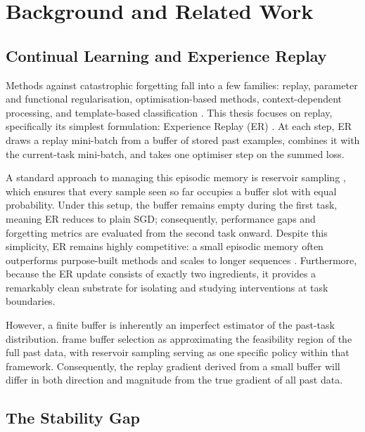 \section{Background and Related Work}
\label{sec:literature}

\subsection{Continual Learning and Experience Replay}
\label{subsec:experience_replay}

Methods against catastrophic forgetting fall into a few families: replay, parameter and functional regularisation, optimisation-based methods, context-dependent processing, and template-based classification \cite{van_de_Ven_2025}. This thesis focuses on replay, specifically its simplest formulation: Experience Replay (ER) \cite{chaudhry2019tinyepisodicmemories}. At each step, ER draws a replay mini-batch from a buffer of stored past examples, combines it with the current-task mini-batch, and takes one optimiser step on the summed loss.

A standard approach to managing this episodic memory is reservoir sampling \cite{vitter1985random}, which ensures that every sample seen so far occupies a buffer slot with equal probability. Under this setup, the buffer remains empty during the first task, meaning ER reduces to plain SGD; consequently, performance gaps and forgetting metrics are evaluated from the second task onward. Despite this simplicity, ER remains highly competitive: a small episodic memory often outperforms purpose-built methods and scales to longer sequences \cite{chaudhry2019tinyepisodicmemories}. Furthermore, because the ER update consists of exactly two ingredients, it provides a remarkably clean substrate for isolating and studying interventions at task boundaries.

However, a finite buffer is inherently an imperfect estimator of the past-task distribution. \citet{aljundi2019gradientbasedsampleselection} frame buffer selection as approximating the feasibility region of the full past data, with reservoir sampling serving as one specific policy within that framework. Consequently, the replay gradient derived from a small buffer will differ in both direction and magnitude from the true gradient of all past data.

\subsection{The Stability Gap}
\label{subsec:stability_gap}

